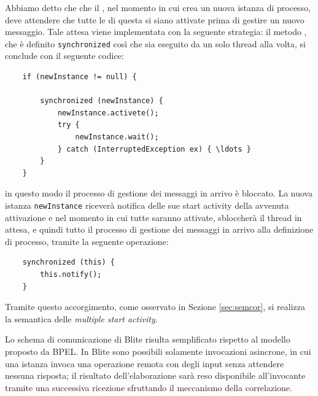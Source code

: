 Abbiamo detto che che il , nel momento in cui crea un nuova
istanza di processo, deve attendere che tutte le  di questa
si siano attivate prima di gestire un nuovo messaggio.
Tale attesa viene implementata con la seguente strategia: il metodo
, che è definito \texttt{synchronized} così che
sia eseguito da un solo thread alla volta, si conclude con il seguente codice:
\begin{lstlisting}
	if (newInstance != null) {
            
		synchronized (newInstance) {
			newInstance.activete();
			try {
				newInstance.wait();
    		} catch (InterruptedException ex) { \ldots }
    	}
	}
\end{lstlisting}
in questo modo il processo di gestione dei messaggi in arrivo è bloccato. La
nuova istanza \texttt{newInstance} riceverà notifica delle sue start activity
della avvenuta attivazione e nel momento in cui tutte saranno attivate,
sbloccherà il thread in attesa, e quindi tutto il processo di gestione dei
messaggi in arrivo alla definizione di processo, tramite la seguente operazione:
\begin{lstlisting}
	synchronized (this) {
    	this.notify();
    }
\end{lstlisting}
Tramite questo accorgimento, come osservato in Sezione \ref{sec:semcor}, si
realizza la semantica delle \emph{multiple start activity}.
\vspace{0.5cm}

Lo schema di comunicazione di Blite risulta semplificato rispetto al modello
proposto da BPEL. In Blite sono possibili solamente invocazioni asincrone, in
cui una istanza invoca una operazione remota con degli input senza attendere
nessuna risposta; il risultato dell'elaborazione sarà reso disponibile
all'invocante tramite una successiva ricezione sfruttando il meccanismo della
correlazione. 

